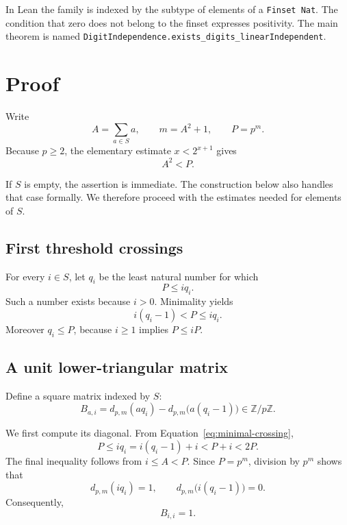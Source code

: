 \documentclass[11pt]{article}
\newcommand{\Z}{\mathbb{Z}}
\newcommand{\Zmod}[1]{\Z/#1\Z}
\newcommand{\digit}{d}
\begin{document}
In Lean the family is indexed by the subtype of elements of a
\texttt{Finset Nat}. The condition that zero does not belong to the finset
expresses positivity. The main theorem is named
\texttt{DigitIndependence.exists\_digits\_linearIndependent}.

\section{Proof}

Write
\begin{equation}
  A=\sum_{a\in S}a,
  \qquad
  m=A^2+1,
  \qquad
  P=p^m.
  \label{eq:parameters}
\end{equation}
Because $p\ge2$, the elementary estimate $x<2^{x+1}$ gives
\begin{equation}
  A^2<P.
  \label{eq:large-P}
\end{equation}

If $S$ is empty, the assertion is immediate. The construction below also
handles that case formally. We therefore proceed with the estimates needed
for elements of $S$.

\subsection{First threshold crossings}

For every $i\in S$, let $q_i$ be the least natural number for which
\begin{equation}
  P\le iq_i.
  \label{eq:crossing}
\end{equation}
Such a number exists because $i>0$. Minimality yields
\begin{equation}
  i(q_i-1)<P\le iq_i.
  \label{eq:minimal-crossing}
\end{equation}
Moreover $q_i\le P$, because $i\ge1$ implies $P\le iP$.

\subsection{A unit lower-triangular matrix}

Define a square matrix indexed by $S$:
\begin{equation}
  B_{a,i}
  =
  \digit_{p,m}(aq_i)
  -
  \digit_{p,m}\bigl(a(q_i-1)\bigr)
  \in\Zmod p.
  \label{eq:B}
\end{equation}

We first compute its diagonal. From
Equation~\eqref{eq:minimal-crossing},
\[
  P\le iq_i=i(q_i-1)+i<P+i<2P.
\]
The final inequality follows from $i\le A<P$. Since $P=p^m$, division by
$p^m$ shows that
\[
  \digit_{p,m}(iq_i)=1,
  \qquad
  \digit_{p,m}\bigl(i(q_i-1)\bigr)=0.
\]
Consequently,
\begin{equation}
  B_{i,i}=1.
  \label{eq:diagonal}
\end{equation}
\end{document}
